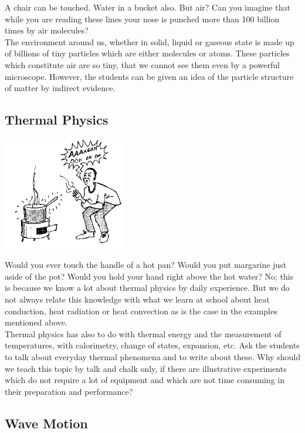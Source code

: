 \begin{multicols}{2}
A chair can be touched. Water in a bucket also. But air? Can you imagine that while you are
reading these lines your nose is punched more than 100 billion times by air molecules?\\

The environment around us, whether in solid, liquid or gaseous state is made up of billions of
tiny particles which are either molecules or atoms. These particles which constitute air are so
tiny, that we cannot see them even by a powerful microscope. However, the students can be
given an idea of the particle structure of matter by indirect evidence.

\subsection{Thermal Physics} 

\begin{center}
\includegraphics[width=0.4\textwidth]{./img/source/thermal-physics.png}
\end{center}

Would you ever touch the handle of a hot pan? Would you put margarine just aside
of the pot? Would you hold your hand right above the hot water? No; this is
because we know a lot about thermal physics by daily experience. But we do not always
relate this knowledge with what we learn at school about heat conduction, heat radiation or
heat convection as is the case in the examples mentioned above.\\

Thermal physics has also to do with thermal energy and the measurement of temperatures,
with calorimetry, change of states, expansion, etc. Ask the students to talk about everyday
thermal phenomena and to write about these. Why should we teach this topic by talk and
chalk only, if there are illustrative experiments which do not require a lot of equipment and
which are not time consuming in their preparation and performance?

\subsection{Wave Motion} 


\end{multicols}
